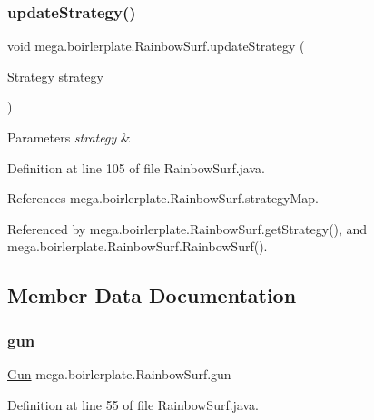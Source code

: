 \subsubsection{\texorpdfstring{update\+Strategy()}{updateStrategy()}}
{\footnotesize\ttfamily void mega.\+boirlerplate.\+Rainbow\+Surf.\+update\+Strategy (\begin{DoxyParamCaption}\item[{Strategy}]{strategy }\end{DoxyParamCaption})}


\begin{DoxyParams}{Parameters}
{\em strategy} & \\
\hline
\end{DoxyParams}


Definition at line 105 of file Rainbow\+Surf.\+java.



References mega.\+boirlerplate.\+Rainbow\+Surf.\+strategy\+Map.



Referenced by mega.\+boirlerplate.\+Rainbow\+Surf.\+get\+Strategy(), and mega.\+boirlerplate.\+Rainbow\+Surf.\+Rainbow\+Surf().



\subsection{Member Data Documentation}
\mbox{\label{classmega_1_1boirlerplate_1_1_rainbow_surf_a5d5324e094dc3d566c8125280299853f}} 
\subsubsection{\texorpdfstring{gun}{gun}}
{\footnotesize\ttfamily \hyperlink{classmega_1_1boirlerplate_1_1_gun}{Gun} mega.\+boirlerplate.\+Rainbow\+Surf.\+gun\hspace{0.3cm}{\ttfamily [private]}}



Definition at line 55 of file Rainbow\+Surf.\+java.

\mbox{\label{classmega_1_1boirlerplate_1_1_rainbow_surf_ac2a284ce071f11b1eb3e6433f7e74d4b}} 
